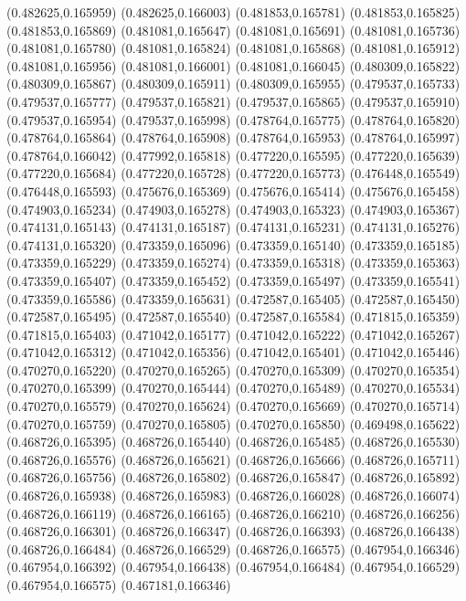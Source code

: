 (0.482625,0.165959)
(0.482625,0.166003)
(0.481853,0.165781)
(0.481853,0.165825)
(0.481853,0.165869)
(0.481081,0.165647)
(0.481081,0.165691)
(0.481081,0.165736)
(0.481081,0.165780)
(0.481081,0.165824)
(0.481081,0.165868)
(0.481081,0.165912)
(0.481081,0.165956)
(0.481081,0.166001)
(0.481081,0.166045)
(0.480309,0.165822)
(0.480309,0.165867)
(0.480309,0.165911)
(0.480309,0.165955)
(0.479537,0.165733)
(0.479537,0.165777)
(0.479537,0.165821)
(0.479537,0.165865)
(0.479537,0.165910)
(0.479537,0.165954)
(0.479537,0.165998)
(0.478764,0.165775)
(0.478764,0.165820)
(0.478764,0.165864)
(0.478764,0.165908)
(0.478764,0.165953)
(0.478764,0.165997)
(0.478764,0.166042)
(0.477992,0.165818)
(0.477220,0.165595)
(0.477220,0.165639)
(0.477220,0.165684)
(0.477220,0.165728)
(0.477220,0.165773)
(0.476448,0.165549)
(0.476448,0.165593)
(0.475676,0.165369)
(0.475676,0.165414)
(0.475676,0.165458)
(0.474903,0.165234)
(0.474903,0.165278)
(0.474903,0.165323)
(0.474903,0.165367)
(0.474131,0.165143)
(0.474131,0.165187)
(0.474131,0.165231)
(0.474131,0.165276)
(0.474131,0.165320)
(0.473359,0.165096)
(0.473359,0.165140)
(0.473359,0.165185)
(0.473359,0.165229)
(0.473359,0.165274)
(0.473359,0.165318)
(0.473359,0.165363)
(0.473359,0.165407)
(0.473359,0.165452)
(0.473359,0.165497)
(0.473359,0.165541)
(0.473359,0.165586)
(0.473359,0.165631)
(0.472587,0.165405)
(0.472587,0.165450)
(0.472587,0.165495)
(0.472587,0.165540)
(0.472587,0.165584)
(0.471815,0.165359)
(0.471815,0.165403)
(0.471042,0.165177)
(0.471042,0.165222)
(0.471042,0.165267)
(0.471042,0.165312)
(0.471042,0.165356)
(0.471042,0.165401)
(0.471042,0.165446)
(0.470270,0.165220)
(0.470270,0.165265)
(0.470270,0.165309)
(0.470270,0.165354)
(0.470270,0.165399)
(0.470270,0.165444)
(0.470270,0.165489)
(0.470270,0.165534)
(0.470270,0.165579)
(0.470270,0.165624)
(0.470270,0.165669)
(0.470270,0.165714)
(0.470270,0.165759)
(0.470270,0.165805)
(0.470270,0.165850)
(0.469498,0.165622)
(0.468726,0.165395)
(0.468726,0.165440)
(0.468726,0.165485)
(0.468726,0.165530)
(0.468726,0.165576)
(0.468726,0.165621)
(0.468726,0.165666)
(0.468726,0.165711)
(0.468726,0.165756)
(0.468726,0.165802)
(0.468726,0.165847)
(0.468726,0.165892)
(0.468726,0.165938)
(0.468726,0.165983)
(0.468726,0.166028)
(0.468726,0.166074)
(0.468726,0.166119)
(0.468726,0.166165)
(0.468726,0.166210)
(0.468726,0.166256)
(0.468726,0.166301)
(0.468726,0.166347)
(0.468726,0.166393)
(0.468726,0.166438)
(0.468726,0.166484)
(0.468726,0.166529)
(0.468726,0.166575)
(0.467954,0.166346)
(0.467954,0.166392)
(0.467954,0.166438)
(0.467954,0.166484)
(0.467954,0.166529)
(0.467954,0.166575)
(0.467181,0.166346)

